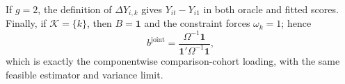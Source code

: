 If \(g=2\), the definition of \(\Delta Y_{i,k}\) gives \(Y_{it}-Y_{i1}\) in both oracle and fitted scores.  Finally, if \(\mathcal K=\{k\}\), then \(B=\mathbf 1\) and the constraint forces \(\omega_k=1\); hence
\[
 b^{\mathrm{joint}}=\frac{\Omega^{-1}\mathbf 1}{\mathbf 1'\Omega^{-1}\mathbf 1},
\]
which is exactly the componentwise comparison-cohort loading, with the same feasible estimator and variance limit.